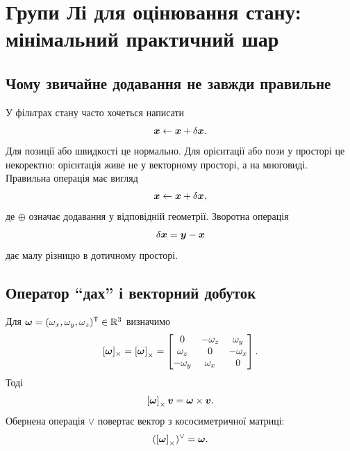 \chapter{Групи Лі для оцінювання стану: мінімальний практичний шар}


\section{Чому звичайне додавання не завжди правильне}

У фільтрах стану часто хочеться написати
\begin{equation}
\bm{x}\leftarrow \bm{x}+\delta\bm{x}.
\end{equation}
Для позиції або швидкості це нормально. Для орієнтації або пози у просторі це некоректно: орієнтація живе не у векторному просторі, а на многовиді. Правильна операція має вигляд
\begin{equation}
\bm{x}\leftarrow \bm{x}+\delta\bm{x},
\end{equation}
де $\oplus$ означає додавання у відповідній геометрії. Зворотна операція
\begin{equation}
\delta\bm{x}=\bm{y}-\bm{x}
\end{equation}
дає малу різницю в дотичному просторі.

\section{Оператор ``дах'' і векторний добуток}

Для $\bm{\omega}=(\omega_x,\omega_y,\omega_z)^{\mathsf{T}}\in\mathbb{R}^3$ визначимо
\begin{equation}\label{eq:hat_so3_session02}
[\bm{\omega}]_{\times}
=\left[\bm{\omega}\right]_{\times}
=\begin{bmatrix}
0&-\omega_z&\omega_y\\
\omega_z&0&-\omega_x\\
-\omega_y&\omega_x&0
\end{bmatrix}.
\end{equation}
Тоді
\begin{equation}
\left[\bm{\omega}\right]_{\times}\bm{v}=\bm{\omega}\times\bm{v}.
\end{equation}
Обернена операція $\vee$ повертає вектор з кососиметричної матриці:
\begin{equation}
(\left[\bm{\omega}\right]_{\times})^{\vee}=\bm{\omega}.
\end{equation}

